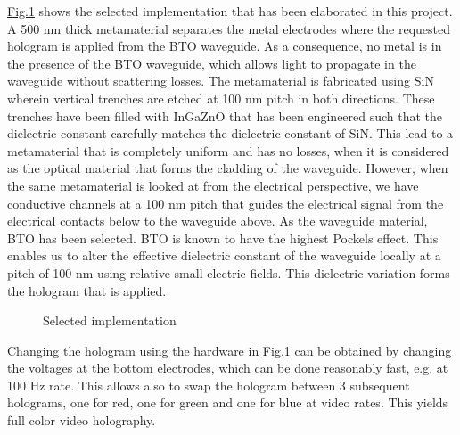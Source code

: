 \documentclass[a4paper,10pt,english,openany,oneside]{jupyterBook}
\begin{document}
\sphinxAtStartPar
\hyperref[\detokenize{intro2:selectedimplementation}]{Fig.\@ \ref{\detokenize{intro2:selectedimplementation}}} shows the selected implementation that has been elaborated in this project. A 500 nm thick metamaterial separates the metal electrodes where the requested hologram is applied from the BTO waveguide. As a consequence, no metal is in the presence of the BTO waveguide, which allows light to propagate in the waveguide without scattering losses. The metamaterial is fabricated using SiN wherein vertical trenches are etched at 100 nm pitch in both directions. These trenches have been filled with InGaZnO that has been engineered such that the dielectric constant carefully matches the dielectric constant of SiN.  This lead to a metamaterial that is completely uniform and has no losses, when it is considered as the optical material that forms the cladding of the waveguide. However, when the same metamaterial is looked at from the electrical perspective, we have conductive channels at a 100 nm pitch that guides the electrical signal from the electrical contacts below to the waveguide above.
As the waveguide material, BTO has been selected. BTO is known to have the highest Pockels effect. This enables us to alter the effective dielectric constant of the waveguide locally at a pitch of 100 nm using relative small electric fields. This dielectric variation forms the hologram that is applied.

\begin{figure}[htbp]
\centering
\capstart

\noindent{}
\caption{Selected implementation}\label{\detokenize{intro2:selectedimplementation}}\end{figure}

\sphinxAtStartPar
Changing the hologram using the hardware in \hyperref[\detokenize{intro2:selectedimplementation}]{Fig.\@ \ref{\detokenize{intro2:selectedimplementation}}} can be obtained by changing the voltages at the bottom electrodes, which can be done reasonably fast, e.g. at 100 Hz rate. This allows also to swap the hologram between 3 subsequent holograms, one for red, one for green and one for blue at video rates. This yields full color video holography.

\begin{DUlineblock}{0em}
\item[] 
\end{DUlineblock}
\end{document}

